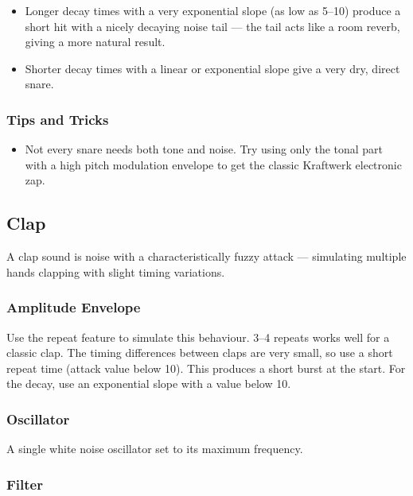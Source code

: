\begin{itemize}
\tightlist
\item
  Longer decay times with a very exponential slope (as low as 5--10)
  produce a short hit with a nicely decaying noise tail --- the tail
  acts like a room reverb, giving a more natural result.
\item
  Shorter decay times with a linear or exponential slope give a very
  dry, direct snare.
\end{itemize}

\subsubsection{Tips and Tricks}\label{tips-and-tricks-1}

\begin{itemize}
\tightlist
\item
  Not every snare needs both tone and noise. Try using only the tonal
  part with a high pitch modulation envelope to get the classic
  Kraftwerk electronic zap.
\end{itemize}

\subsection{Clap}\label{clap}

A clap sound is noise with a characteristically fuzzy attack ---
simulating multiple hands clapping with slight timing variations.

\subsubsection{Amplitude Envelope}\label{amplitude-envelope-2}

Use the repeat feature to simulate this behaviour. 3--4 repeats works
well for a classic clap. The timing differences between claps are very
small, so use a short repeat time (attack value below 10). This produces
a short burst at the start. For the decay, use an exponential slope with
a value below 10.

\subsubsection{Oscillator}\label{oscillator-1}

A single white noise oscillator set to its maximum frequency.

\subsubsection{Filter}\label{filter}

